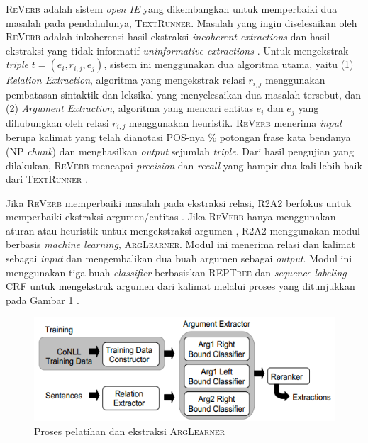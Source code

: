 \textsc{ReVerb} adalah sistem \textit{open IE} yang dikembangkan untuk memperbaiki dua masalah pada pendahulunya, \textsc{TextRunner}. Masalah yang ingin diselesaikan oleh \textsc{ReVerb} adalah inkoherensi hasil ekstraksi \textit{incoherent extractions} dan hasil ekstraksi yang tidak informatif \textit{uninformative extractions} \citep{fader2011identifying}. Untuk mengekstrak \textit{triple} $t = (e_i, r_{i,j}, e_j)$, sistem ini menggunakan dua algoritma utama, yaitu (1) \textit{Relation Extraction}, algoritma yang mengekstrak relasi $r_{i,j}$ menggunakan pembatasan sintaktik dan leksikal yang menyelesaikan dua masalah tersebut, dan (2) \textit{Argument Extraction}, algoritma yang mencari entitas $e_i$ dan $e_j$ yang dihubungkan oleh relasi $r_{i,j}$ menggunakan heuristik.  \textsc{ReVerb} menerima \textit{input} berupa kalimat yang telah dianotasi POS-nya \% potongan frase kata bendanya (NP \textit{chunk}) dan menghasilkan \textit{output} sejumlah \textit{triple}. Dari hasil pengujian yang dilakukan, \textsc{ReVerb} mencapai \textit{precision} dan \textit{recall} yang hampir dua kali lebih baik dari \textsc{TextRunner} \citep{fader2011identifying}.

Jika \textsc{ReVerb} memperbaiki masalah pada ekstraksi relasi, \textsc{R2A2} berfokus untuk memperbaiki ekstraksi argumen/entitas \citep{etzioni2011open}. Jika \textsc{ReVerb} hanya menggunakan aturan atau heuristik untuk mengekstraksi argumen \citep{fader2011identifying}, \textsc{R2A2} menggunakan modul berbasis \textit{machine learning}, \textsc{ArgLearner}. Modul ini menerima relasi dan kalimat sebagai \textit{input} dan mengembalikan dua buah argumen sebagai \textit{output}. Modul ini menggunakan tiga buah \textit{classifier} berbasiskan \textsc{REPTree} \citep{hall2009weka} dan \textit{sequence labeling} CRF \citep{mccallum2002mallet} untuk mengekstrak argumen dari kalimat melalui proses yang ditunjukkan pada Gambar \ref{fig:arglearner_architecture} \citep{etzioni2011open}.

\begin{figure}
\centering
\includegraphics[scale=0.5]{../images/arglearner_architecture.png}
\caption{Proses pelatihan dan ekstraksi \textsc{ArgLearner}}
\label{fig:arglearner_architecture}
\end{figure}

